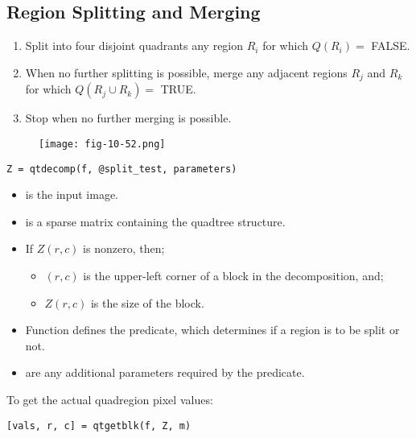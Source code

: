 \subsection{Region Splitting and Merging}

\begin{frame}%
\begin{enumerate}
\item Split into four disjoint quadrants any region $R_{i}$ for which $Q(R_{i}) = $ FALSE.
\item When no further splitting is possible, merge any adjacent regions $R_{j}$ and $R_{k}$ for which $Q(R_{j} \cup R_{k}) = $ TRUE.
\item Stop when no further merging is possible.
\end{enumerate}
\begin{figure}[!h]
\centering
\texttt{[image: fig-10-52.png]}
\end{figure}
\end{frame}

\begin{frame}[fragile]
\begin{lstlisting}
Z = qtdecomp(f, @split_test, parameters)
\end{lstlisting}
\begin{itemize}
\item {} is the input image.
\item {} is a sparse matrix containing the quadtree structure.
\item If $Z(r,c)$ is nonzero, then;
\begin{itemize}
\item $(r,c)$ is the upper-left corner of a block in the decomposition, and;
\item $Z(r,c)$ is the size of the block.
\end{itemize}
\item Function  defines the predicate, which determines if a region is to be split or not.
\item {} are any additional parameters required by the predicate.
\end{itemize}
\end{frame}

\begin{frame}[fragile]
To get the actual quadregion pixel values:
\begin{lstlisting}
[vals, r, c] = qtgetblk(f, Z, m)
\end{lstlisting}
\end{frame}

